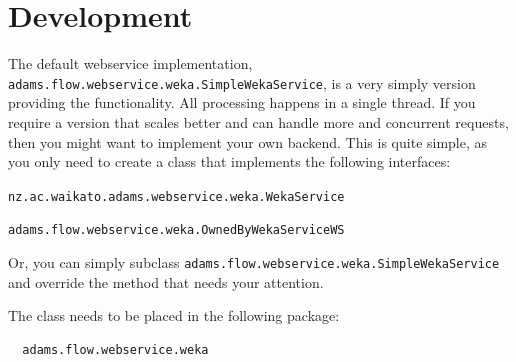 \documentclass[a4paper]{book}
\begin{document}
\chapter{Development}
The default webservice implementation, \texttt{adams.flow.webservice.weka.SimpleWekaService},
is a very simply version providing the functionality. All processing happens
in a single thread. If you require a version that scales better and can handle
more and concurrent requests, then you might want to implement your own
backend. This is quite simple, as you only need to create a class that implements
the following interfaces:
\begin{tight_itemize}
	\item \texttt{nz.ac.waikato.adams.webservice.weka.WekaService}
	\item \texttt{adams.flow.webservice.weka.OwnedByWekaServiceWS}
\end{tight_itemize}
Or, you can simply subclass \texttt{adams.flow.webservice.weka.SimpleWekaService}
and override the method that needs your attention.

The class needs to be placed in the following package:
\begin{verbatim}
  adams.flow.webservice.weka
\end{verbatim}


\end{document}
